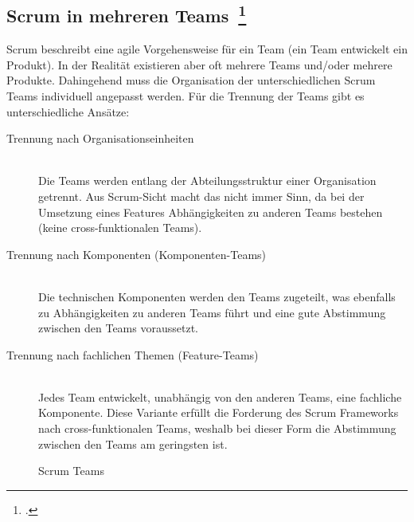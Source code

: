 \subsection[Scrum in mehreren Teams]{Scrum in mehreren Teams~\footcite[vgl.][S.172ff]{scrum_kurz_gut_2013}}

Scrum beschreibt eine agile Vorgehensweise für ein Team (ein Team entwickelt ein Produkt).
In der Realität existieren aber oft mehrere Teams und/oder mehrere Produkte. 
Dahingehend muss die Organisation der unterschiedlichen Scrum Teams individuell angepasst werden.
Für die Trennung der Teams gibt es unterschiedliche Ansätze:
\begin{description}
  \item[Trennung nach Organisationseinheiten] \hfill \\ Die Teams werden entlang der Abteilungsstruktur einer Organisation getrennt. Aus Scrum-Sicht macht das nicht immer Sinn, da bei der Umsetzung eines Features Abhängigkeiten zu anderen Teams bestehen (keine cross-funktionalen Teams).
  \item[Trennung nach Komponenten (Komponenten-Teams)] \hfill \\ Die technischen Komponenten werden den Teams zugeteilt, was ebenfalls zu Abhängigkeiten zu anderen Teams führt und eine gute Abstimmung zwischen den Teams voraussetzt.
  \item[Trennung nach fachlichen Themen (Feature-Teams)] \hfill \\ Jedes Team entwickelt, unabhängig von den anderen Teams, eine fachliche Komponente. Diese Variante erfüllt die Forderung des Scrum Frameworks nach cross-funktionalen Teams, weshalb bei dieser Form die Abstimmung zwischen den Teams am geringsten ist.
\end{description}

\begin{savenotes}
  \begin{figure}[H]
    \centering
  \caption{Scrum Teams}\label{fig:Scrum Teams}
  \end{figure}
\end{savenotes}

